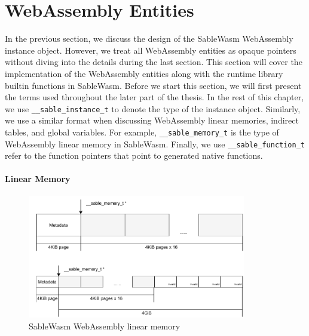 \section{WebAssembly Entities}
\label{section:runtime-webassembly-entities}

In the previous section, we discuss the design of the SableWasm WebAssembly
instance object. However, we treat all WebAssembly entities as opaque pointers
without diving into the details during the last section. This section will cover
the implementation of the WebAssembly entities along with the runtime library
builtin functions in SableWasm. Before we start this section, we will first
present the terms used throughout the later part of the thesis. In the rest of
this chapter, we use \texttt{\_\_sable\_instance\_t} to denote the type of the
instance object. Similarly, we use a similar format when discussing WebAssembly
linear memories, indirect tables, and global variables. For example,
\texttt{\_\_sable\_memory\_t} is the type of WebAssembly linear memory in
SableWasm. Finally, we use \texttt{\_\_sable\_function\_t} refer to the function
pointers that point to generated native functions.

\paragraph{Linear Memory}

\begin{figure}
    \centering
    \includegraphics[width=0.85\textwidth]{Images/5.Backend and Runtime/memory}
    \caption{SableWasm WebAssembly linear memory}
    \label{fig:backend-memory}
\end{figure}

